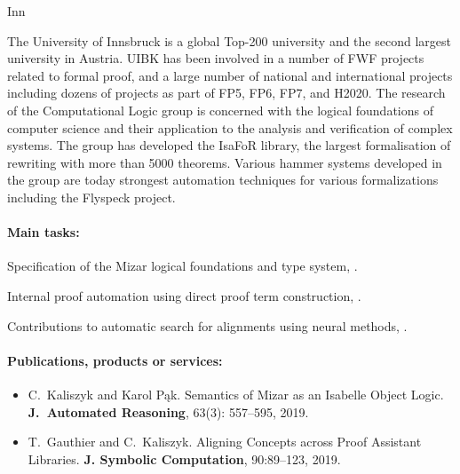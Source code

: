 \begin{sitedescription}{Inn}

The University of Innsbruck is a global Top-200 university and the second
largest university in Austria. UIBK has been involved in a number of FWF
projects related to formal proof, and a large number of national and
international projects including dozens of projects as part of FP5,
FP6, FP7, and H2020.
%
The research of the Computational Logic group is concerned with the logical
foundations of computer science and their application to the analysis and
verification of complex systems. The group has developed the IsaFoR library,
the largest formalisation of rewriting with more than 5000 theorems. Various
hammer systems developed in the group are today strongest automation techniques
for various formalizations including the Flyspeck project.

\paragraph*{Main tasks:}

\begin{compactitem}
\item Specification of the Mizar logical foundations and type system,  .
\item Internal proof automation using direct proof term construction, %
   .
\item Contributions to automatic search for alignments using neural methods,  .
\end{compactitem}

\paragraph*{Publications, products or services:}
\begin{itemize}
\item
C.~Kaliszyk and Karol Pąk.
\newblock Semantics of Mizar as an Isabelle Object Logic.
\textbf{J.~Automated Reasoning}, 63(3): 557--595, 2019.

\item
T.~Gauthier and C.~Kaliszyk.
\newblock Aligning Concepts across Proof Assistant Libraries.
\textbf{J. Symbolic Computation}, 90:89--123, 2019.


\end{itemize}
\end{sitedescription}
